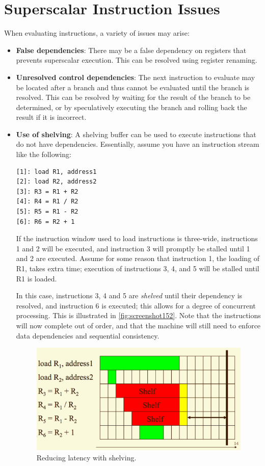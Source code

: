 \section{Superscalar Instruction Issues}
When evaluating instructions, a variety of issues may arise: \begin{itemize}
\item \textbf{False dependencies}: There may be a false dependency on registers that prevents superscalar execution. This can be resolved using register renaming.
\item \textbf{Unresolved control dependencies}: The next instruction to evaluate may be located after a branch and thus cannot be evaluated until the branch is resolved. This can be resolved by waiting for the result of the branch to be determined, or by speculatively executing the branch and rolling back the result if it is incorrect.
\item \textbf{Use of shelving}: A shelving buffer can be used to execute instructions that do not have dependencies. Essentially, assume you have an instruction stream like the following:
\begin{lstlisting}[language={}]
[1]: load R1, address1 
[2]: load R2, address2
[3]: R3 = R1 + R2
[4]: R4 = R1 / R2
[5]: R5 = R1 - R2
[6]: R6 = R2 + 1
\end{lstlisting}
If the instruction window used to load instructions is three-wide, instructions 1 and 2 will be executed, and instruction 3 will promptly be stalled until 1 and 2 are executed. Assume for some reason that instruction 1, the loading of R1, takes extra time; execution of instructions 3, 4, and 5 will be stalled until R1 is loaded. 

In this case, instructions 3, 4 and 5 are \textit{shelved} until their dependency is resolved, and instruction 6 is executed; this allows for a degree of concurrent processing. This is illustrated in \autoref{fig:screenshot152}. Note that the instructions will now complete out of order, and that the machine will still need to enforce data dependencies and sequential consistency.

\begin{figure}
\centering
\includegraphics[width=0.7\linewidth]{screenshot152}
\caption{Reducing latency with shelving.}
\label{fig:screenshot152}
\end{figure}

\end{itemize}

